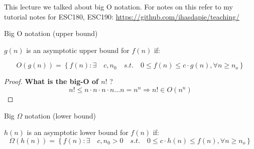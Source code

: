 \documentclass[10pt]{article}
\begin{document}
This lecture we talked about big O notation. For notes on this refer to my tutorial notes for ESC180, ESC190: \href{https://github.com/ihasdapie/teaching/}{https://github.com/ihasdapie/teaching/}


\begin{definition}
	Big O notation (upper bound)

	$ g(n) $  is an asymptotic upper bound for $ f(n) $ if:

	\begin{equation}
		O(g(n)) = \left\{f(n): \exists \quad c, n_0 \quad s.t. \quad 0 \le  f(n) \le  c\cdot g(n), \forall n \ge  n_o \right\}
		\label{eq:358:bigOh}
	\end{equation}
\end{definition}

\begin{proof}

	\textbf{What is the big-O of $ n! $ }?
	\begin{equation}
			n! \le n \cdot n \cdot n \cdot  n \ldots n = n^n \Rightarrow n! \in O(n^n) 
	\end{equation}
\end{proof}



\begin{definition}
	Big $ \Omega $  notation (lower bound)

	$ h(n) $  is an asymptotic lower bound for $ f(n) $ if:
	\begin{equation}
		\Omega(h(n)) =  \left\{f(n): \exists \quad {c, n_0} > 0 \quad s.t. \quad 0 \le c \cdot h(n) \le  f(n), \forall n \ge  n_o \right\}
		\label{eq:358:bigOmega}
	\end{equation}
\end{definition}
\end{document}
